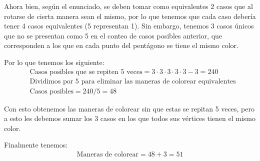 \documentclass[spanish, fleqn]{article}
\begin{document}
	Ahora bien, según el enunciado, se deben tomar como equivalentes 2 casos que al rotarse de cierta manera sean el mismo, por lo que tenemos que cada caso debería tener 4 casos equivalentes (5 representan 1). Sin embargo, tenemos 3 casos únicos que no se presentan como 5 en el conteo de casos posibles anterior, que corresponden a los que en cada punto del pentágono se tiene el mismo color.
	
	Por lo que tenemos los siguiente:	
	\begin{align*}
	&\text{Casos posibles que se repiten 5 veces}=3\cdot 3\cdot 3\cdot 3\cdot 3-3=240\\
	&\text{Dividimos por 5 para eliminar las maneras de colorear equivalentes}\\
	&\text{Casos posibles}=240/5=48
	\end{align*}
	
	Con esto obtenemos las maneras de colorear sin que estas se repitan 5 veces, pero a esto les debemos sumar los 3 casos en los que todos sus vértices tienen el mismo color.
	
	Finalmente tenemos:
	\begin{align*}
	\text{Maneras de colorear}=48+3=51
	\end{align*}		
	
\end{document}
